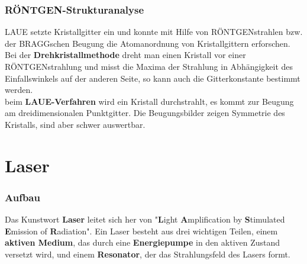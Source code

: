 \documentclass[12pt,a4paper,ngerman]{article}
\begin{document}
\subsubsection*{RÖNTGEN-Strukturanalyse}
LAUE setzte Kristallgitter ein und konnte mit Hilfe von RÖNTGENstrahlen bzw. der BRAGGschen Beugung die Atomanordnung von Kristallgittern erforschen. \\
Bei der \textbf{Drehkristallmethode} dreht man einen Kristall vor einer RÖNTGENstrahlung und misst die Maxima der Strahlung in Abhängigkeit des Einfallswinkels auf der anderen Seite, so kann auch die Gitterkonstante bestimmt werden. \\
beim \textbf{LAUE-Verfahren} wird ein Kristall durchstrahlt, es kommt zur Beugung am dreidimensionalen Punktgitter. Die Beugungsbilder zeigen Symmetrie des Kristalls, sind aber schwer auswertbar. 























\section{Laser}
\subsubsection*{Aufbau}
Das Kunstwort \textbf{Laser} leitet sich her von "\textbf{L}ight \textbf{A}mplification by \textbf{S}timulated \textbf{E}mission of \textbf{R}adiation". Ein Laser besteht aus drei wichtigen Teilen, einem \textbf{aktiven Medium}, das durch eine \textbf{Energiepumpe} in den aktiven Zustand versetzt wird, und einem \textbf{Resonator}, der das Strahlungsfeld des Lasers formt.
\end{document}
